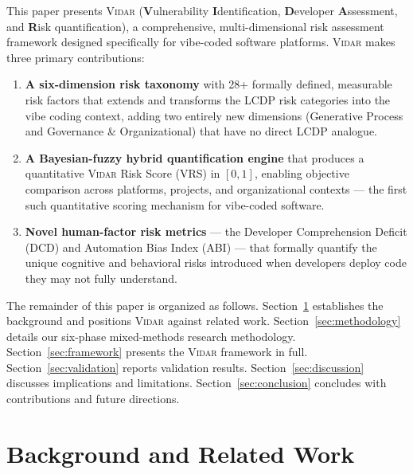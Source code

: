 \documentclass[preprint,review,12pt]{elsarticle}
\newcommand{\vidar}{\textsc{Vidar}}
\begin{document}
This paper presents \vidar{} (\textbf{V}ulnerability \textbf{I}dentification, \textbf{D}eveloper \textbf{A}ssessment, and \textbf{R}isk quantification), a comprehensive, multi-dimensional risk assessment framework designed specifically for vibe-coded software platforms. \vidar{} makes three primary contributions:

\begin{enumerate}[label=\textbf{C\arabic*.}]
    \item \textbf{A six-dimension risk taxonomy} with 28+ formally defined, measurable risk factors that extends and transforms the LCDP risk categories into the vibe coding context, adding two entirely new dimensions (Generative Process and Governance \& Organizational) that have no direct LCDP analogue.

    \item \textbf{A Bayesian-fuzzy hybrid quantification engine} that produces a quantitative \vidar{} Risk Score (VRS) in $[0,1]$, enabling objective comparison across platforms, projects, and organizational contexts --- the first such quantitative scoring mechanism for vibe-coded software.

    \item \textbf{Novel human-factor risk metrics} --- the Developer Comprehension Deficit (DCD) and Automation Bias Index (ABI) --- that formally quantify the unique cognitive and behavioral risks introduced when developers deploy code they may not fully understand.
\end{enumerate}

The remainder of this paper is organized as follows. Section~\ref{sec:background} establishes the background and positions \vidar{} against related work. Section~\ref{sec:methodology} details our six-phase mixed-methods research methodology. Section~\ref{sec:framework} presents the \vidar{} framework in full. Section~\ref{sec:validation} reports validation results. Section~\ref{sec:discussion} discusses implications and limitations. Section~\ref{sec:conclusion} concludes with contributions and future directions.

\section{Background and Related Work}
\label{sec:background}
\end{document}
